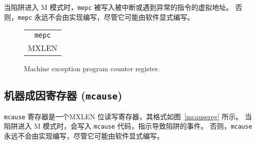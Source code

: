 \iffalse
When a trap is taken into M-mode, {\tt mepc} is written with the
virtual address of the instruction that was interrupted or that
encountered the exception.  Otherwise, {\tt mepc} is never written by
the implementation, though it may be explicitly written by software.
\fi

当陷阱进入 M 模式时，{\tt mepc} 被写入被中断或遇到异常的指令的虚拟地址。 否则，{\tt mepc} 永远不会由实现编写，尽管它可能由软件显式编写。

\begin{figure}[h!]
{\footnotesize
\begin{center}
\begin{tabular}{@{}J}
 \\
\hline
{} \\
\hline
MXLEN \\
\end{tabular}
\end{center}
}
\vspace{-0.1in}
\caption{Machine exception program counter register.}
\label{mepcreg}
\end{figure}

\subsection{机器成因寄存器 ({\tt mcause})}
\label{sec:mcause}

\iffalse
The {\tt mcause} register is an MXLEN-bit read-write register formatted as
shown in Figure~\ref{mcausereg}.  When a trap is taken into M-mode, {\tt
mcause} is written with a code indicating the event that caused the trap.
Otherwise, {\tt mcause} is never written by the implementation, though it may be
explicitly written by software.

The Interrupt bit in the {\tt mcause} register is set if the
trap was caused by an interrupt. The Exception Code field
 contains a code identifying the last exception or interrupt.  Table~\ref{mcauses}
lists the possible machine-level exception codes.  The Exception Code
is a \wlrl\ field, so is only guaranteed to hold supported exception
codes.
\fi

{\tt mcause} 寄存器是一个MXLEN 位读写寄存器，其格式如图~\ref{mcausereg} 所示。 当陷阱进入 M 模式时，会写入 {\tt mcause} 代码，指示导致陷阱的事件。 否则，{\tt mcause} 永远不会由实现编写，尽管它可能由软件显式编写。

